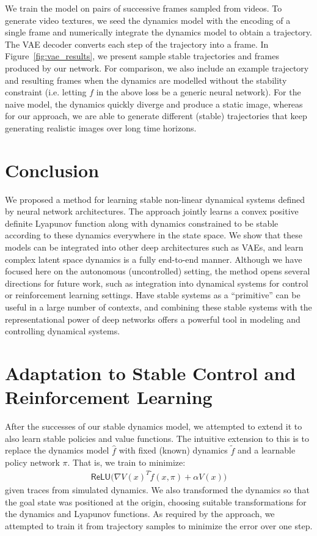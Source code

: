 We train the model on pairs of successive frames sampled from videos. To generate video textures, we seed the dynamics model with the encoding of a single frame and numerically integrate the dynamics model to obtain a trajectory. The VAE decoder converts each step of the trajectory into a frame. In Figure~\ref{fig:vae_results}, we present sample stable trajectories and frames produced by our network. For comparison, we also include an example trajectory and resulting frames when the dynamics are modelled without the stability constraint (i.e. letting $f$ in the above loss be a generic neural network).  For the naive model, the dynamics quickly diverge and produce a static image, whereas for our approach, we are able to generate different (stable) trajectories that keep generating realistic images over long time horizons.

\section{Conclusion}

We proposed a method for learning stable non-linear dynamical systems defined by neural network architectures. The approach jointly learns a convex positive definite Lyapunov function along with dynamics constrained to be stable according to these dynamics everywhere in the state space.  We show that these models can be integrated into other deep architectures such as VAEs, and learn complex latent space dynamics is a fully end-to-end manner.  Although we have focused here on the autonomous (uncontrolled) setting, the method opens several directions for future work, such as integration into dynamical systems for control or reinforcement learning settings.  Have stable systems as a ``primitive'' can be useful in a large number of contexts, and combining these stable systems with the representational power of deep networks offers a powerful tool in modeling and controlling dynamical systems.


\section{Adaptation to Stable Control and Reinforcement Learning }

After the successes of our stable dynamics model, we attempted to extend it to also learn stable policies and value functions. The intuitive extension to this is to replace the dynamics model $\hat f$ with fixed (known) dynamics $\tilde f$ and a learnable policy network $\pi$. That is, we train to minimize:
\begin{align}
  \mathsf{ReLU}\bigl(\nabla V(x)^T \tilde{f}(x, \pi) + \alpha V (x) \bigr)
\end{align}
given traces from simulated dynamics. We also transformed the dynamics so that the goal state was positioned at the origin, choosing suitable transformations for the dynamics and Lyapunov functions. As required by the approach, we attempted to train it from trajectory samples to minimize the error over one step.

